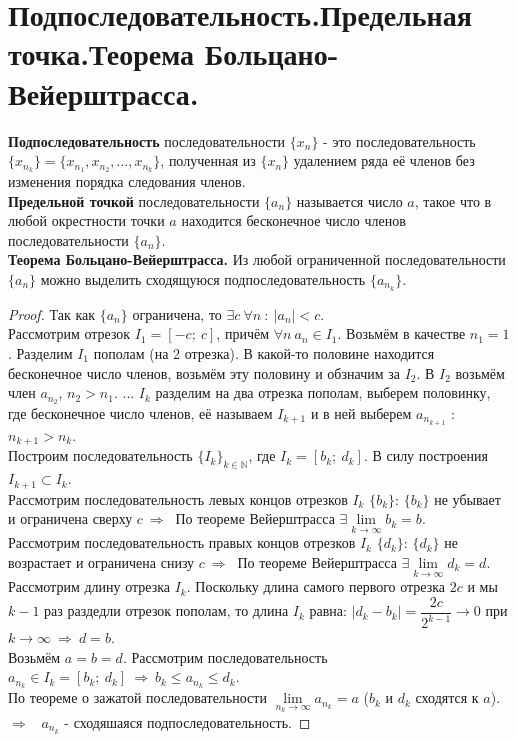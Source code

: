 \documentclass[12pt]{article}
\begin{document}
\section{Подпоследовательность.Предельная точка.Теорема Больцано-Вейерштрасса.}
\textbf{Подпоследовательность} последовательности $\{x_n\}$ - это последовательность $\{x_{n_k}\} = \{x_{n_1}, x_{n_2}, ..., x_{n_k}\}$, полученная из $\{x_n\}$ удалением ряда её членов без изменения порядка следования членов. \\
\textbf{Предельной точкой} последовательности $\{a_n\}$ называется число $a$, такое что в любой окрестности точки $a$ находится бесконечное число членов последовательности $\{a_n\}$. \\
\textbf{Теорема Больцано-Вейерштрасса.} Из любой ограниченной последовательности $\{a_n\}$ можно выделить сходящуюся подпоследовательность  $\{a_{n_k}\}$.
\begin{proof}
    Так как  $\{a_n\}$ ограничена, то $\exists c \ \forall n \ : \ |a_n| < c$. \\
    Рассмотрим отрезок $I_1 = [-c; \ c]$, причём $\forall n \ a_n \in I_1$. Возьмём в качестве $n_1 = 1$. Разделим $I_1$ пополам (на 2 отрезка). В какой-то половине находится бесконечное число членов, возьмём эту половину и обзначим за $I_2$. В $I_2$ возьмём член $a_{n_2}$, $n_2 > n_1$. ... $I_k$ разделим на два отрезка пополам, выберем половинку, где бесконечное число членов, её называем $I_{k+1}$ и в ней выберем $a_{n_{k+1}}$ : $n_{k+1} > n_k$. \\
    Построим последовательность $\{I_k\}_{k \in \mathbb{N}}$, где $I_k = [b_k; \ d_k]$. В силу построения $I_{k+1} \subset I_k$. \\ 
    Рассмотрим последовательность левых концов отрезков $I_k$ $\{b_k\}$: $\{b_k\}$ не убывает и ограничена сверху $c \ \Rightarrow \ $ По теореме Вейерштрасса $\exists \lim\limits_{k \to \infty} b_k = b$. \\
    Рассмотрим последовательность правых концов отрезков $I_k$ $\{d_k\}$: $\{d_k\}$ не возрастает и ограничена снизу $c \ \Rightarrow \ $ По теореме Вейерштрасса $\exists \lim\limits_{k \to \infty} d_k = d$. \\
    Рассмотрим длину отрезка $I_k$. Поскольку длина самого первого отрезка  $2c$ и мы $k-1$ раз раздедли отрезок пополам, то длина $I_k$ равна:  $|d_k - b_k| = \dfrac{2c}{2^{k-1}}  \to 0 $ при $k \to \infty \ \Rightarrow \ d = b$. \\
    Возьмём $a = b = d$. Рассмотрим последовательность $a_{n_k} \in I_k = [b_k; \ d_k] \ \Rightarrow \ b_k \leq a_{n_k} \leq d_k$. \\
    По теореме о зажатой последовательности $\lim\limits_{n_k \to \infty} a_{n_k} = a$ ($b_k$ и $d_k$ сходятся к $a$). \ $\Rightarrow$ \ 
    $a_{n_k}$ - сходяшаяся подпоследовательность.
\end{proof}
\end{document}
